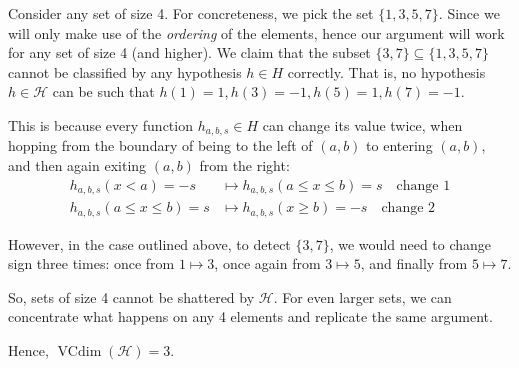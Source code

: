 \documentclass[11pt]{article}
\renewcommand{\H}{\ensuremath{\mathcal{H}}}
\DeclareMathOperator{\vcdim}{VCdim}
\newcommand{\vc}{\ensuremath{\vcdim}}
\begin{document}
Consider any set of size 4. For concreteness, we pick the set $\{1, 3, 5, 7\}$.
Since we will only make use of the \emph{ordering} of the elements, hence our argument
will work for any set of size 4 (and higher).
We claim that the subset $\{3, 7\} \subseteq \{1, 3, 5, 7\}$ cannot be classified
by any hypothesis $h \in H$ correctly. That is,  no hypothesis $h \in \H$ can
be such that  $h(1) = 1, h(3) = -1, h(5) = 1, h(7) = -1$.

This is because every function $h_{a, b, s} \in H$ can change its value twice, when
hopping from the boundary of being to the left of $(a, b)$ to entering $(a, b)$,
and then again exiting $(a, b)$ from the right:
\begin{align*}
h_{a, b, s}(x < a) = -s  &\mapsto h_{a, b, s}(a \leq x \leq b) = s \quad \text{change 1} \\
h_{a, b, s}(a \leq x \leq b) = s &\mapsto h_{a, b, s}(x \geq b) = -s \quad \text{change 2}
\end{align*}

However, in the case outlined above, to detect $\{3, 7\}$,
we would need to change sign three times:
once from $1 \mapsto 3$, once again from $3 \mapsto 5$, and finally from $5 \mapsto 7$.

So, sets of size 4 cannot be shattered by $\H$. For even larger sets, we can concentrate
what happens on any 4 elements and replicate the same argument.

Hence, $\vc(\H) = 3$.
\end{document}
